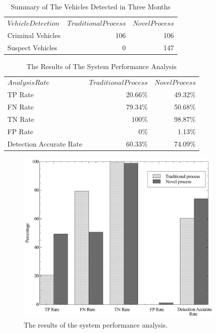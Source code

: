 \documentclass{llncs}
\begin{document}
\begin{table}
\caption{Summary of The Vehicles Detected in Three Months}
\label{table_vehiclesDetected}
\begin{center}
\renewcommand{\arraystretch}{1.4}
\setlength\tabcolsep{3pt}
\begin{tabular}{lrr}
\hline\noalign{\smallskip}
$Vehicle Detection$ & $Traditional Process$ & $Novel Process$\\
\noalign{\smallskip}
\hline
\noalign{\smallskip}
Criminal Vehicles & 106 & 106\\
Suspect Vehicles & 0 & 147\\
\hline
\end{tabular}
\end{center}
\end{table}

\begin{table}
\caption{The Results of The System Performance Analysis}
\label{table_results}
\begin{center}
\renewcommand{\arraystretch}{1.4}
\setlength\tabcolsep{3pt}
\begin{tabular}{lrr}
\hline\noalign{\smallskip}
$Analysis Rate$ & $Traditional Process$ & $Novel Process$\\
\noalign{\smallskip}
\hline
\noalign{\smallskip}
TP Rate & 20.66\% & 49.32\%\\
FN Rate & 79.34\% & 50.68\%\\
TN Rate & 100\% & 98.87\%\\
FP Rate & 0\% & 1.13\%\\
Detection Accurate Rate & 60.33\% & 74.09\%\\
\hline
\end{tabular}
\end{center}
\end{table}

\begin{figure}
\centering
\includegraphics[width=0.9\textwidth]{images/results.pdf}
\caption{The results of the system performance analysis.}
\label{fig:graphresults}
\end{figure}
\end{document}
